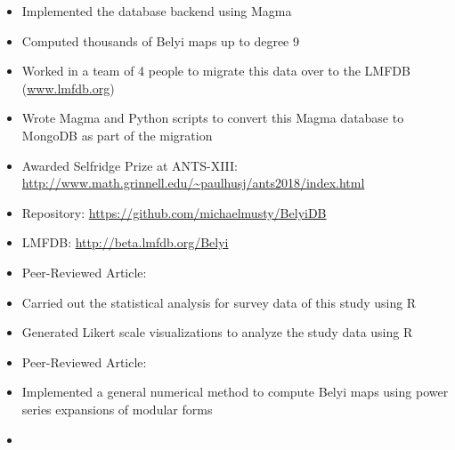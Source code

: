 \documentclass[a4paper]{adcv}
\begin{document}
{\begin{adcvtabletwo}
\begin{itemize}
      \end{itemize}
    \adcvrowskip
      \vspace{-10pt}
      \begin{itemize}
        \item
          Implemented the database backend using Magma
        \item
          Computed thousands of Belyi maps up to degree 9
        \item
          Worked in a team of 4 people to migrate this data over
          to the LMFDB (\url{www.lmfdb.org})
        \item
          Wrote Magma and Python scripts to convert this Magma database
          to MongoDB as part of the migration
        \item
          Awarded Selfridge Prize at ANTS-XIII:
          \url{http://www.math.grinnell.edu/~paulhusj/ants2018/index.html}
        \item
          Repository: \url{https://github.com/michaelmusty/BelyiDB}
        \item
          LMFDB: \url{http://beta.lmfdb.org/Belyi}
        \item
          Peer-Reviewed Article: \cite{ants}
      \end{itemize}
    \adcvrowskip
      \vspace{-10pt}
      \begin{itemize}
        \item
          Carried out the statistical analysis for survey data of this study
          using R
        \item
          Generated Likert scale visualizations to analyze the study data
          using R
        \item
          Peer-Reviewed Article: \cite{aaron}
      \end{itemize}
    \adcvrowskip
      \vspace{-10pt}
      \begin{itemize}
        \item
          Implemented a general numerical method to compute
          Belyi maps using power series expansions of modular forms
        \item

\end{itemize}
\end{adcvtabletwo}}
\end{document}
